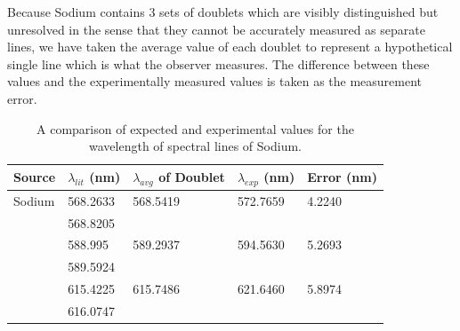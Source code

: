 \begin{enumerate}
Because Sodium contains 3 sets of doublets which are visibly distinguished but unresolved in the sense that they cannot be accurately measured as separate lines, we have taken the average value of each doublet to represent a hypothetical single line which is what the observer measures. The difference between these values and the experimentally measured values is taken as the measurement error.

\begin{table}[ht]
\center
\begin{tabular}{|l|l|l|l|l|}
\hline
\multicolumn{1}{|c|}{Source} & \multicolumn{1}{c|}{$\lambda_{lit}$ (nm)} & \multicolumn{1}{c|}{$\lambda_{avg}$ of Doublet} & \multicolumn{1}{c|}{$\lambda_{exp}$ (nm)} & \multicolumn{1}{c|}{Error (nm)} \\ \hline
Sodium                       & 568.2633                                        & 568.5419                                          & 572.7659                                         & 4.2240                    \\ \hline
                             & 568.8205                                        &                                                   &                                                  &                                 \\ \hline
                             & 588.995                                         & 589.2937                                          & 594.5630                                         & 5.2693                     \\ \hline
                             & 589.5924                                        &                                                   &                                                  &                                 \\ \hline
                             & 615.4225                                        & 615.7486                                          & 621.6460                                         & 5.8974                    \\ \hline
                             & 616.0747                                        &                                                   &                                                  &                                 \\ \hline
\end{tabular}
\caption{A comparison of expected and experimental values for the wavelength of spectral lines of Sodium.}
\label{tab:spcg8}
\end{table}

\end{enumerate}



